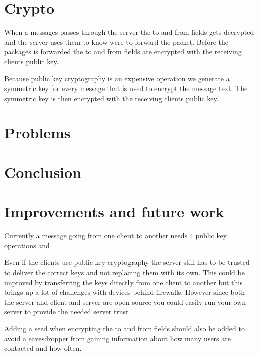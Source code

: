 \documentclass[twocolumn,11pt]{IEEEtran}
\begin{document}
 \section{Crypto}
When a messages passes through the server the to and from fields gets decrypted and the server uses them to know were to forward the packet. Before the packages is forwarded the to and from fields are encrypted with the receiving clients public key.

 Because public key cryptography is an expensive operation we generate a symmetric key for every message that is used to encrypt the message text. The symmetric key is then encrypted with the receiving clients public key. 

\section{Problems}
\label{sec:problems}


\section {Conclusion}
\label{sec:conclusion}

\section {Improvements and future work}
\label{sec:improve}
Currently a message going from one client to another needs 4 public key operations and 

Even if the clients use public key cryptography the server still has to be trusted to deliver the correct keys and not replacing them with its own. This could be improved by transferring the keys directly from one client to another but this brings up a lot of challenges with devices behind firewalls. However since both the server and client and server are open source you could easily run your own server to provide the needed server trust.

Adding a seed when encrypting the to and from fields should also be added to avoid a eavesdropper from gaining information about how many users are contacted and how often. 

%
%
\end{document}
